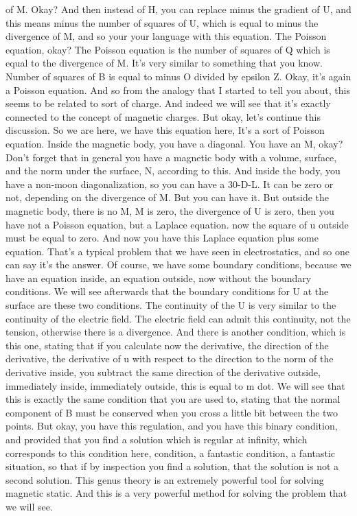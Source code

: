of M. Okay? And then instead of H, you can replace minus the gradient of U, and this means minus the number of squares of U, which is equal to minus the divergence of M, and so your your language with this equation. The Poisson equation, okay? The Poisson equation is the number of squares of Q which is equal to the divergence of M. It's very similar to something that you know. Number of squares of B is equal to minus O divided by epsilon Z. Okay, it's again a Poisson equation. And so from the analogy that I started to tell you about, this seems to be related to sort of charge. And indeed we will see that it's exactly connected to the concept of magnetic charges. But okay, let's continue this discussion. So we are here, we have this equation here, It's a sort of Poisson equation. Inside the magnetic body, you have a diagonal. You have an M, okay? Don't forget that in general you have a magnetic body with a volume, surface, and the norm under the surface, N, according to this. And inside the body, you have a non-moon diagonalization, so you can have a 30-D-L. It can be zero or not, depending on the divergence of M. But you can have it. But outside the magnetic body, there is no M, M is zero, the divergence of U is zero, then you have not a Poisson equation, but a Laplace equation. now the square of u outside must be equal to zero. And now you have this Laplace equation plus some equation. That's a typical problem that we have seen in electrostatics, and so one can say it's the answer. Of course, we have some boundary conditions, because we have an equation inside, an equation outside, now without the boundary conditions. We will see afterwards that the boundary conditions for U at the surface are these two conditions. The continuity of the U is very similar to the continuity of the electric field. The electric field can admit this continuity, not the tension, otherwise there is a divergence. And there is another condition, which is this one, stating that if you calculate now the derivative, the direction of the derivative, the derivative of u with respect to the direction to the norm of the derivative inside, you subtract the same direction of the derivative outside, immediately inside, immediately outside, this is equal to m dot. We will see that this is exactly the same condition that you are used to, stating that the normal component of B must be conserved when you cross a little bit between the two points. But okay, you have this regulation, and you have this binary condition, and provided that you find a solution which is regular at infinity, which corresponds to this condition here, condition, a fantastic condition, a fantastic situation, so that if by inspection you find a solution, that the solution is not a second solution. This genus theory is an extremely powerful tool for solving magnetic static. And this is a very powerful method for solving the problem that we will see.
